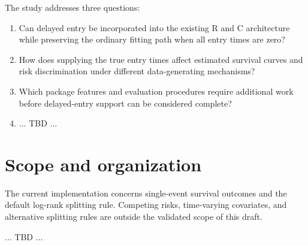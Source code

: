 The study addresses three questions:
\begin{enumerate}
\item Can delayed entry be incorporated into the existing R and C architecture
while preserving the ordinary fitting path when all entry times are zero?
\item How does supplying the true entry times affect estimated survival curves
and risk discrimination under different data-generating mechanisms?
\item Which package features and evaluation procedures require additional work
before delayed-entry support can be considered complete?
\item ... TBD ...
\end{enumerate}

\section{Scope and organization}
The current implementation concerns single-event survival outcomes and the
default log-rank splitting rule. Competing risks, time-varying covariates, and
alternative splitting rules are outside the validated scope of this draft.

... TBD ... 
